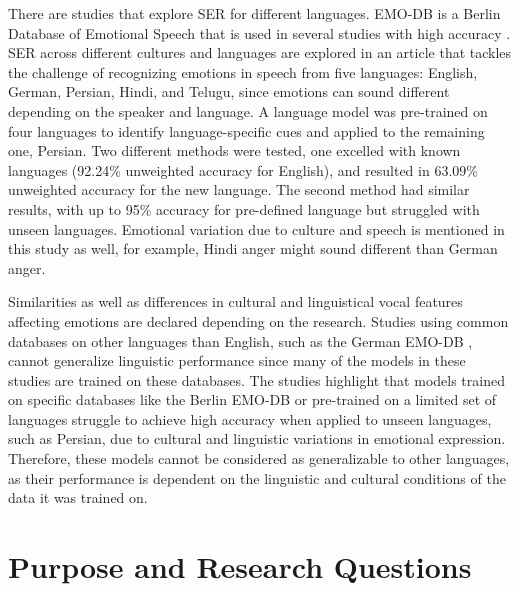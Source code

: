 There are studies that explore SER for different languages. EMO-DB is a Berlin Database of Emotional Speech that is used in several studies with high accuracy \autocite{Alroobaea2024, Khalil2019, Zhao2019, Jahangir2022}. SER across different cultures and languages are explored in an article \autocite{Pandey2023} that tackles the challenge of recognizing emotions in speech from five languages: English, German, Persian, Hindi, and Telugu, since emotions can sound different depending on the speaker and language. A language model was pre-trained on four languages to identify language-specific cues and applied to the remaining one, Persian. Two different methods were tested, one excelled with known languages (92.24\% unweighted accuracy for English), and resulted in 63.09\% unweighted accuracy for the new language. The second method had similar results, with up to 95\% accuracy for pre-defined language but struggled with unseen languages. Emotional variation due to culture and speech is mentioned in this study as well, for example, Hindi anger might sound different than German anger. 

Similarities as well as differences in cultural and linguistical vocal features affecting emotions are declared depending on the research. Studies using common databases on other languages than English, such as the German EMO-DB \autocite{Alroobaea2024, Khalil2019, Zhao2019, Jahangir2022}, cannot generalize linguistic performance since many of the models in these studies are trained on these databases. The studies highlight that models trained on specific databases like the Berlin EMO-DB or pre-trained on a limited set of languages struggle to achieve high accuracy when applied to unseen languages, such as Persian, due to cultural and linguistic variations in emotional expression. Therefore, these models cannot be considered as generalizable to other languages, as their performance is dependent on the linguistic and cultural conditions of the data it was trained on. 

\newpage
\section{Purpose and Research Questions}

